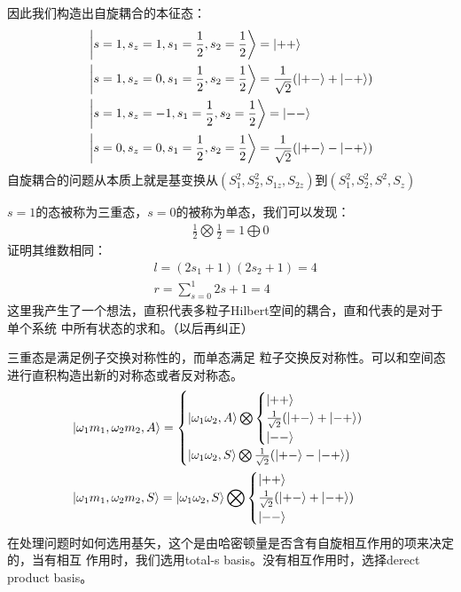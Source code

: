 \documentclass[UTF8]{article}
\numberwithin{equation}{section}
\begin{document}
因此我们构造出自旋耦合的本征态：
\begin{align*}
     & \ket{s=1,s_z=1,s_{1}=\frac{1}{2},s_{2}=\frac{1}{2}}=\ket{++}                              \\
     & \ket{s=1,s_z=0,s_{1}=\frac{1}{2},s_{2}=\frac{1}{2}}=\frac{1}{\sqrt{2}}(\ket{+-}+\ket{-+}) \\
     & \ket{s=1,s_z=-1,s_{1}=\frac{1}{2},s_{2}=\frac{1}{2}}=\ket{--}                             \\
     & \ket{s=0,s_z=0,s_{1}=\frac{1}{2},s_{2}=\frac{1}{2}}=\frac{1}{\sqrt{2}}(\ket{+-}-\ket{-+})
\end{align*}
自旋耦合的问题从本质上就是基变换从$(S_{1}^2,S_{2}^2,S_{1z},S_{2z})$到$(S_1^2,S_2^2,S^2,S_z)$

$s=1$的态被称为三重态，$s=0$的被称为单态，我们可以发现：
\begin{align*}
    \frac{1}{2}\bigotimes\frac{1}{2}=1\bigoplus 0
\end{align*}
证明其维数相同：
\begin{align*}
     & l = (2s_1+1)(2s_2+1)=4 \\
     & r=\sum_{s=0}^1 2s+1=4
\end{align*}
这里我产生了一个想法，直积代表多粒子Hilbert空间的耦合，直和代表的是对于单个系统
中所有状态的求和。（以后再纠正）

三重态是满足例子交换对称性的，而单态满足
粒子交换反对称性。可以和空间态进行直积构造出新的对称态或者反对称态。
\begin{align*}
     & \ket{\omega_1 m_1,\omega_2 m_2,A}=
    \begin{cases}
        \ket{\omega_1\omega_2,A}\bigotimes \begin{cases}
                                               \ket{++}                              \\
                                               \frac{1}{\sqrt{2}}(\ket{+-}+\ket{-+}) \\
                                               \ket{--}
                                           \end{cases} \\
        \ket{\omega_1\omega_2, S}\bigotimes  \frac{1}{\sqrt{2}}(\ket{+-}-\ket{-+})
    \end{cases}                                     \\
     & \ket{\omega_1 m_1,\omega_2 m_2,S}=\ket{\omega_1\omega_2,S}\bigotimes \begin{cases}
                                                                                \ket{++}                              \\
                                                                                \frac{1}{\sqrt{2}}(\ket{+-}+\ket{-+}) \\
                                                                                \ket{--}
                                                                            \end{cases}
\end{align*}
在处理问题时如何选用基矢，这个是由哈密顿量是否含有自旋相互作用的项来决定的，当有相互
作用时，我们选用total-s basis。没有相互作用时，选择derect product basis。
\end{document}

